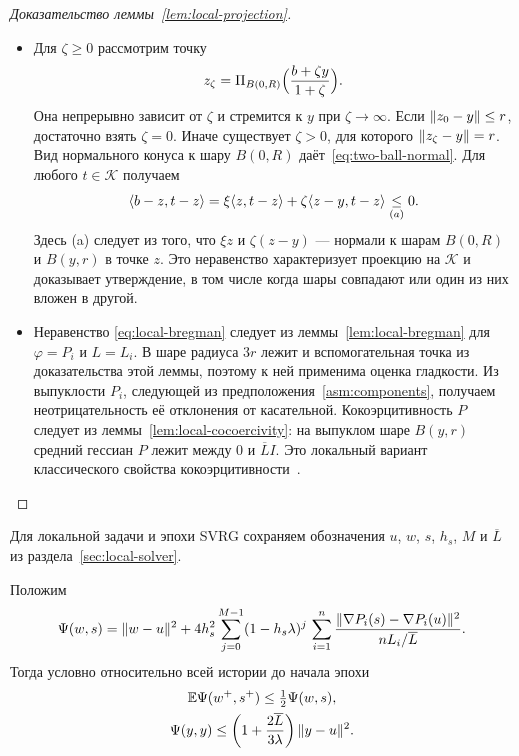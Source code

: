 \begin{proof}[Доказательство леммы~\ref{lem:local-projection}]
\leavevmode
\begin{itemize}
\item Для $\zeta\ge0$ рассмотрим точку
\[
 z_\zeta=\Pi_{B(0,R)}\Bigl(\frac{b+\zeta y}{1+\zeta}\Bigr).
\]
Она непрерывно зависит от $\zeta$ и стремится к $y$ при $\zeta\to\infty$.
Если $\lVert z_0-y\rVert\le r$, достаточно взять $\zeta=0$. Иначе существует
$\zeta>0$, для которого $\lVert z_\zeta-y\rVert=r$. Вид нормального конуса
к шару $B(0,R)$ даёт~\eqref{eq:two-ball-normal}. Для любого $t\in\mathcal K$ получаем
\[
 \langle b-z,t-z\rangle
 =\xi\langle z,t-z\rangle+\zeta\langle z-y,t-z\rangle
 \mathrel{\underset{(a)}{\le}}0.
\]
Здесь (a) следует из того, что $\xi z$ и $\zeta(z-y)$ --- нормали
к шарам $B(0,R)$ и $B(y,r)$ в точке $z$.
Это неравенство характеризует проекцию на $\mathcal K$ и доказывает
утверждение, в том числе когда шары совпадают или один из них вложен в другой.
\item Неравенство \eqref{eq:local-bregman} следует из
леммы~\ref{lem:local-bregman} для $\varphi=P_i$ и $L=L_i$.
В шаре радиуса $3r$ лежит и вспомогательная точка из доказательства
этой леммы, поэтому к ней применима оценка гладкости.
Из выпуклости $P_i$, следующей из предположения~\ref{asm:components},
получаем неотрицательность
её отклонения от касательной. Кокоэрцитивность $P$ следует из
леммы~\ref{lem:local-cocoercivity}: на выпуклом шаре $B(y,r)$
средний гессиан $P$ лежит между $0$ и $\overline LI$.
Это локальный вариант классического свойства
кокоэрцитивности~\citep{baillon1977}.
\end{itemize}
\end{proof}

Для локальной задачи и эпохи SVRG сохраняем обозначения $u$, $w$, $s$,
$h_s$, $M$ и $\overline L$ из раздела~\ref{sec:local-solver}.

\begin{lemma}\label{lem:svrg-contraction}
Положим
\begin{equation}\label{eq:svrg-potential}
 \Psi(w,s)=\lVert w-u\rVert^2
 +4h_s^2\sum_{j=0}^{M-1}(1-h_s\lambda)^j\,
 \sum_{i=1}^n\frac{\lVert\nabla P_i(s)-\nabla P_i(u)\rVert^2}{nL_i/\overline L}.
\end{equation}
Тогда условно относительно всей истории до начала эпохи
\begin{equation}\label{eq:svrg-contraction}
 \begin{gathered}
 \mathbb E\Psi(w^+,s^+)\le\tfrac12\Psi(w,s),\\
 \Psi(y,y)\le\left(1+\frac{2\overline L}{3\lambda}\right)\lVert y-u\rVert^2.
 \end{gathered}
\end{equation}
\end{lemma}

